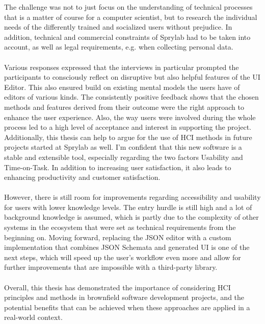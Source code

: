 The challenge was not to just focus on the understanding of technical processes that is a matter of course for a computer scientist, but to research the individual needs of the differently trained and socialized users without prejudice. In addition, technical and commercial constraints of Sprylab had to be taken into account, as well as legal requirements, e.g. when collecting personal data.
\\\\
Various responses expressed that the interviews in particular prompted the participants to consciously reflect on disruptive but also helpful features of the UI Editor. This also ensured build on existing mental models the users have of editors of various kinds. 
The consistently positive feedback shows that the chosen methods and features derived from their outcome were the right approach to enhance the user experience.
Also, the way users were involved during the whole process led to a high level of acceptance and interest in supporting the project.
Additionally, this thesis can help to argue for the use of HCI methods in future projects started at Sprylab as well.
I'm confident that this new software is a stable and extensible tool, especially regarding the two factors Usability and Time-on-Task.
In addition to increasing user satisfaction, it also leads to enhancing productivity and customer satisfaction.
\\\\
However, there is still room for improvements regarding accessibility and usability for users with lower knowledge levels.
The entry hurdle is still high and a lot of background knowledge is assumed, which is partly due to the complexity of other systems in the ecosystem that were set as technical requirements from the beginning on.
Moving forward, replacing the JSON editor with a custom implementation that combines JSON Schemata and generated UI is one of the next steps, which will speed up the user's
workflow even more and allow for further improvements that are impossible with a third-party library.
\\\\
Overall, this thesis has demonstrated the importance of considering HCI principles and methods in brownfield software development projects, and the potential benefits that can be achieved when these approaches are applied in a real-world context.